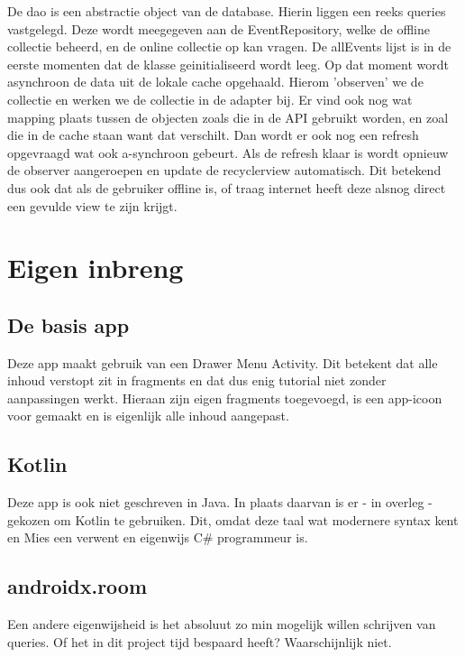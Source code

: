 \documentclass[dutch]{report}
\begin{document}
	De dao is een abstractie object van de database. Hierin liggen een reeks queries vastgelegd. Deze wordt
	meegegeven aan de EventRepository, welke de offline collectie beheerd, en de online collectie op kan vragen. 
	De allEvents lijst is in de eerste momenten dat de klasse geinitialiseerd wordt leeg. Op dat moment wordt 
	asynchroon de data uit de lokale cache opgehaald. Hierom 'observen' we de collectie en werken we de collectie
	in de adapter bij. Er vind ook nog wat mapping plaats tussen de objecten zoals die in de API gebruikt worden, 
	en zoal die in de cache staan want dat verschilt. Dan wordt er ook nog een refresh opgevraagd wat ook 
	a-synchroon gebeurt. Als de refresh klaar is wordt opnieuw de observer aangeroepen en update de recyclerview 
	automatisch. Dit betekend dus ook dat als de gebruiker offline is, of traag internet heeft deze alsnog direct
	een gevulde view te zijn krijgt. 
	
	\section{Eigen inbreng}\label{eigen-inbreng}
	\subsection{De basis app}
	Deze app maakt gebruik van een Drawer Menu Activity. Dit betekent dat alle inhoud verstopt zit in fragments
	en dat dus enig tutorial niet zonder aanpassingen werkt. Hieraan zijn eigen fragments toegevoegd, is een 
	app-icoon voor gemaakt en is eigenlijk alle inhoud aangepast. 
	
	\subsection{Kotlin}
	Deze app is ook niet geschreven in Java. In plaats daarvan is er  - in overleg -gekozen om Kotlin te gebruiken. 
	Dit, omdat deze taal wat modernere syntax kent en Mies een verwent en eigenwijs C\# programmeur is.

	\subsection{androidx.room}
	Een andere eigenwijsheid is het absoluut zo min mogelijk willen schrijven van queries. Of het in dit project 
	tijd bespaard heeft? Waarschijnlijk niet. 
	
\end{document}
